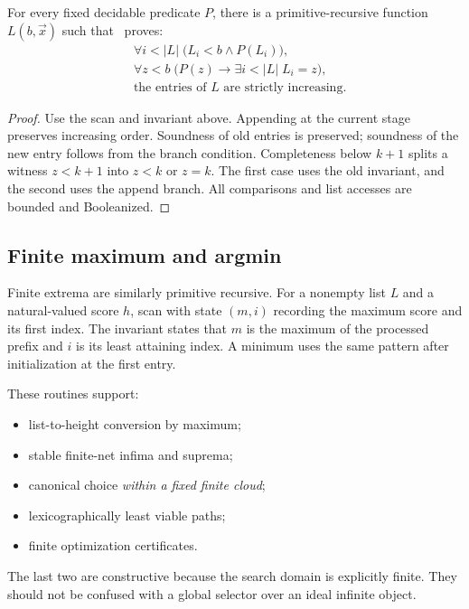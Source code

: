 \begin{theorem}\label{thm:bounded-enumeration}
For every fixed decidable predicate \(P\), there is a primitive-recursive function \(L(b,\vec x)\) such that \iPRA\ proves:
\begin{align*}
 &\forall i<|L|\;\bigl(L_i<b\wedge P(L_i)\bigr),\\
 &\forall z<b\;\bigl(P(z)\to\exists i<|L|\;L_i=z\bigr),\\
 &\text{the entries of }L\text{ are strictly increasing.}
\end{align*}
\end{theorem}

\begin{proof}
Use the scan and invariant above.  Appending at the current stage preserves increasing order.  Soundness of old entries is preserved; soundness of the new entry follows from the branch condition.  Completeness below \(k+1\) splits a witness \(z<k+1\) into \(z<k\) or \(z=k\).  The first case uses the old invariant, and the second uses the append branch.  All comparisons and list accesses are bounded and Booleanized.
\end{proof}

\subsection{Finite maximum and argmin}

Finite extrema are similarly primitive recursive.  For a nonempty list \(L\) and a natural-valued score \(h\), scan with state \((m,i)\) recording the maximum score and its first index.  The invariant states that \(m\) is the maximum of the processed prefix and \(i\) is its least attaining index.  A minimum uses the same pattern after initialization at the first entry.

These routines support:
\begin{itemize}
\item list-to-height conversion by maximum;
\item stable finite-net infima and suprema;
\item canonical choice \emph{within a fixed finite cloud};
\item lexicographically least viable paths;
\item finite optimization certificates.
\end{itemize}
The last two are constructive because the search domain is explicitly finite.  They should not be confused with a global selector over an ideal infinite object.

